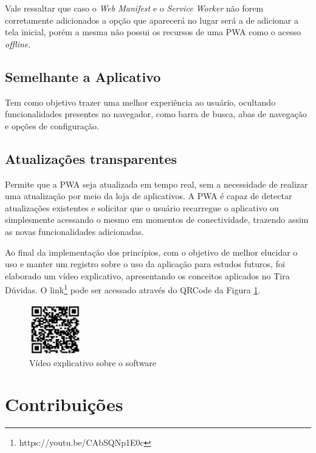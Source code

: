 \documentclass[12pt]{article}
\begin{document}
Vale ressaltar que caso o \textit{Web Manifest} e o \textit{Service Worker} não forem corretamente adicionados a opção que aparecerá no lugar será a de adicionar a tela inicial, porém a mesma não possui os recursos de uma PWA como o acesso \textit{offline}.

\subsection{Semelhante a Aplicativo} \label{sec:semelhante_aplicativo}

Tem como objetivo trazer uma melhor experiência ao usuário, ocultando funcionalidades presentes no navegador, como barra de busca, abas de navegação e opções de configuração.

\subsection{Atualizações transparentes} \label{sec:atualizacoes}

Permite que a PWA seja atualizada em tempo real, sem a necessidade de realizar uma atualização por meio da loja de aplicativos. A PWA é capaz de detectar atualizações existentes e solicitar que o usuário recarregue o aplicativo ou simplesmente acessando o mesmo em momentos de conectividade, trazendo assim as novas funcionalidades adicionadas.

Ao final da implementação dos princípios, com o objetivo de melhor elucidar o uso e manter um registro sobre o uso da aplicação para estudos futuros, foi elaborado um vídeo explicativo, apresentando os conceitos aplicados no Tira Dúvidas. O link\footnote{https://youtu.be/CAbSQNp1E0c} pode ser acessado através do QRCode da Figura \ref{fig:video_funcionamento}.

\begin{figure}[ht!]
\centering
\includegraphics[width=0.2\textwidth]{imagens/video_funcionamento.jpg}
\caption{Vídeo explicativo sobre o software}
\label{fig:video_funcionamento}
\end{figure}

\section{Contribuições} \label{sec:contribuicoes}
\end{document}
